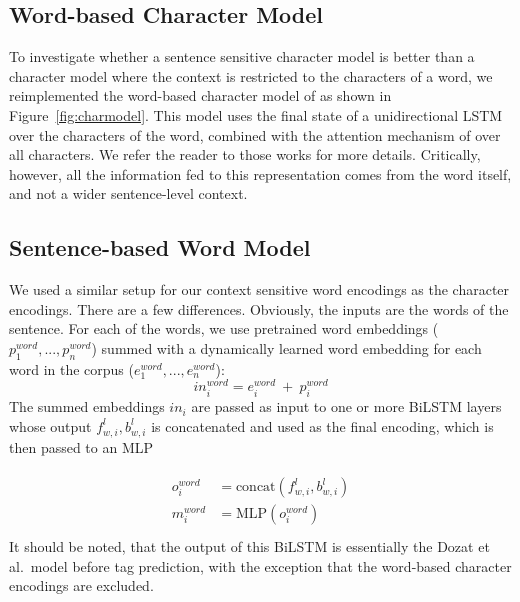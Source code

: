 \documentclass[11pt,a4paper]{article}
\begin{document}
\subsection{Word-based Character Model}
\label{sec:word-based}

To investigate whether a sentence sensitive character model is better than a character model where the context is restricted to the characters of a word, we reimplemented the word-based character model of  as shown in  Figure~\ref{fig:charmodel}. This model uses the final state of a unidirectional LSTM over the characters of the word, combined with the attention mechanism of  over all characters. We refer the reader to those works for more details. Critically, however, all the information fed to this representation comes from the word itself, and not a wider sentence-level context.



\subsection{Sentence-based Word Model}
\label{sec:word-model}

We used a similar setup for our context sensitive word encodings as the character encodings. There are a few differences. Obviously, the inputs are the words of the sentence. For each of the words, we use pretrained word embeddings ($p_1^{word}, ..., p_n^{word}$) summed with a dynamically learned word embedding for each word in the corpus ($e_1^{word}, ..., e_n^{word}$):
\[in_i^{word} = e_i^{word}~+~p_i^{word}\]
The summed embeddings $in_i$ are passed as input to one or more BiLSTM layers whose output $f_{w,i}^l, b_{w,i}^l$ is concatenated and used as the final encoding, which is then passed to an MLP 

\begin{eqnarray}
\nonumber
\left.\begin{aligned}
o_i^{word} &=\textrm{concat}(f_{w,i}^l, b_{w,i}^l) \\ \nonumber
m_i^{word} &=\textrm{MLP}(o_i^{word}) \label{equation:mlp-word}\\
\end{aligned}\right.
\end{eqnarray}
It should be noted, that the output of this BiLSTM is essentially the Dozat et al.\ model before tag prediction, with the exception that the word-based character encodings are excluded.

\end{document}
